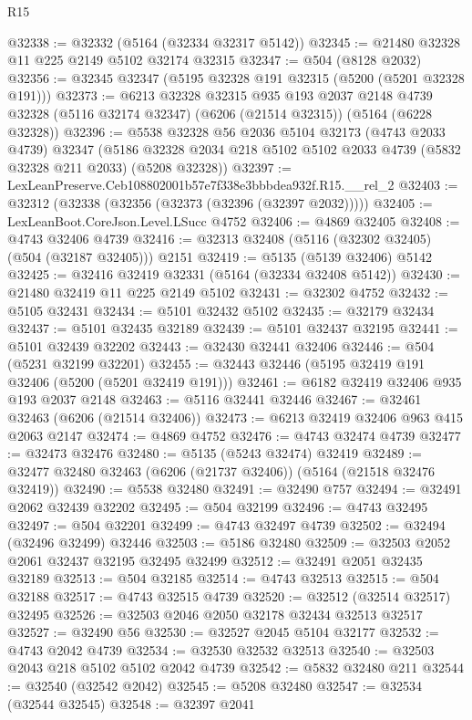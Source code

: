 \begin{lexlean}{R15}
\begin{coremodule}
{{{{{{{{{{{@32338 := @32332 (@5164 (@32334 @32317 @5142))
@32345 := @21480 @32328 @11 @225 @2149 @5102 @32174 @32315
@32347 := @504 (@8128 @2032)
@32356 := @32345 @32347 (@5195 @32328 @191 @32315 (@5200 (@5201 @32328 @191)))
@32373 := @6213
    @32328
    @32315
    @935
    @193
    @2037
    @2148
    @4739
    @32328
    (@5116 @32174 @32347)
    (@6206 (@21514 @32315))
    (@5164 (@6228 @32328))
@32396 := @5538
    @32328
    @56
    @2036
    @5104
    @32173
    (@4743 @2033 @4739)
    @32347
    (@5186 @32328 @2034 @218 @5102 @5102 @2033 @4739 (@5832 @32328 @211 @2033) (@5208 @32328))
@32397 := LexLeanPreserve.Ceb108802001b57e7f338e3bbbdea932f.R15.__rel_2
@32403 := @32312 (@32338 (@32356 (@32373 (@32396 (@32397 @2032)))))
@32405 := LexLeanBoot.CoreJson.Level.LSucc @4752
@32406 := @4869 @32405
@32408 := @4743 @32406 @4739
@32416 := @32313 @32408 (@5116 (@32302 @32405) (@504 (@32187 @32405))) @2151
@32419 := @5135 (@5139 @32406) @5142
@32425 := @32416 @32419 @32331 (@5164 (@32334 @32408 @5142))
@32430 := @21480 @32419 @11 @225 @2149 @5102
@32431 := @32302 @4752
@32432 := @5105 @32431
@32434 := @5101 @32432 @5102
@32435 := @32179 @32434
@32437 := @5101 @32435 @32189
@32439 := @5101 @32437 @32195
@32441 := @5101 @32439 @32202
@32443 := @32430 @32441 @32406
@32446 := @504 (@5231 @32199 @32201)
@32455 := @32443 @32446 (@5195 @32419 @191 @32406 (@5200 (@5201 @32419 @191)))
@32461 := @6182 @32419 @32406 @935 @193 @2037 @2148
@32463 := @5116 @32441 @32446
@32467 := @32461 @32463 (@6206 (@21514 @32406))
@32473 := @6213 @32419 @32406 @963 @415 @2063 @2147
@32474 := @4869 @4752
@32476 := @4743 @32474 @4739
@32477 := @32473 @32476
@32480 := @5135 (@5243 @32474) @32419
@32489 := @32477 @32480 @32463 (@6206 (@21737 @32406)) (@5164 (@21518 @32476 @32419))
@32490 := @5538 @32480
@32491 := @32490 @757
@32494 := @32491 @2062 @32439 @32202
@32495 := @504 @32199
@32496 := @4743 @32495
@32497 := @504 @32201
@32499 := @4743 @32497 @4739
@32502 := @32494 (@32496 @32499) @32446
@32503 := @5186 @32480
@32509 := @32503 @2052 @2061 @32437 @32195 @32495 @32499
@32512 := @32491 @2051 @32435 @32189
@32513 := @504 @32185
@32514 := @4743 @32513
@32515 := @504 @32188
@32517 := @4743 @32515 @4739
@32520 := @32512 (@32514 @32517) @32495
@32526 := @32503 @2046 @2050 @32178 @32434 @32513 @32517
@32527 := @32490 @56
@32530 := @32527 @2045 @5104 @32177
@32532 := @4743 @2042 @4739
@32534 := @32530 @32532 @32513
@32540 := @32503 @2043 @218 @5102 @5102 @2042 @4739
@32542 := @5832 @32480 @211
@32544 := @32540 (@32542 @2042)
@32545 := @5208 @32480
@32547 := @32534 (@32544 @32545)
@32548 := @32397 @2041
}}}}}}}}}}}
\end{coremodule}
\end{lexlean}
